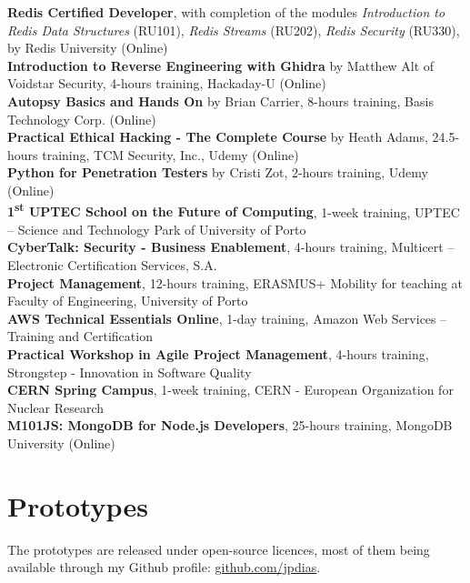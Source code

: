 \documentclass[10pt, a4paper]{article}
\newcommand{\FEUP}{Faculty of Engineering, University of Porto}
\newcommand{\years}[1]{\marginnote{\raggedleft\footnotesize #1}}
\begin{document}
\years{2022}  
\textbf{Redis Certified Developer}, with completion of the modules \textit{Introduction to Redis Data Structures} (RU101), \textit{Redis Streams} (RU202), \textit{Redis Security} (RU330), by Redis University (Online)
\\[0.42em]
\years{2020}  
\textbf{Introduction to Reverse Engineering with Ghidra} by Matthew Alt of Voidstar Security,  4-hours training, Hackaday-U (Online)
\\[0.42em]
\textbf{Autopsy Basics and Hands On} by Brian Carrier, 8-hours training, Basis Technology Corp. (Online)
\\[0.42em]
\textbf{Practical Ethical Hacking - The Complete Course} by Heath Adams, 24.5-hours training, TCM Security, Inc., Udemy (Online)
\\[0.42em]
\textbf{Python for Penetration Testers} by Cristi Zot, 2-hours training, Udemy (Online)
\\[0.42em]
\years{2018} 
\textbf{1\textsuperscript{st} UPTEC School on the Future of Computing}, 1-week training, UPTEC – Science and Technology Park of University of Porto
\\[0.42em]
\years{2017} 
\textbf{CyberTalk: Security - Business Enablement}, 4-hours training, Multicert – Electronic Certification Services, S.A.
\\[0.42em]
\textbf{Project Management}, 12-hours training, ERASMUS+ Mobility for teaching at \FEUP
\\[0.42em]
\years{2016} 
\textbf{AWS Technical Essentials Online}, 1-day training, Amazon Web Services – Training and Certification
\\[0.42em]
\years{2015} 
\textbf{Practical Workshop in Agile Project Management}, 4-hours training, Strongstep - Innovation in Software Quality
\\[0.42em]
\textbf{CERN Spring Campus}, 1-week training, CERN - European Organization for Nuclear Research
\\[0.42em]
\years{2014} 
\textbf{M101JS: MongoDB for Node.js Developers}, 25-hours training, MongoDB University (Online)



\section*{Prototypes}

The prototypes are released under open-source licences, most of them being available through my Github profile:
\href{https://github.com/jpdias/}{github.com/jpdias}.
\\
\end{document}
